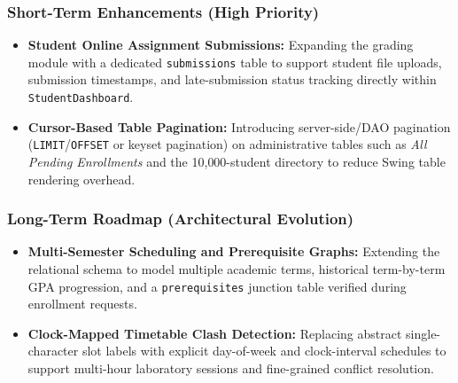\subsubsection{Short-Term Enhancements (High Priority)}
\begin{itemize}
    \item \textbf{Student Online Assignment Submissions:} Expanding the grading module with a dedicated \texttt{submissions} table to support student file uploads, submission timestamps, and late-submission status tracking directly within \texttt{StudentDashboard}.
    \item \textbf{Cursor-Based Table Pagination:} Introducing server-side/DAO pagination (\texttt{LIMIT}/\texttt{OFFSET} or keyset pagination) on administrative tables such as \emph{All Pending Enrollments} and the 10{,}000-student directory to reduce Swing table rendering overhead.
\end{itemize}

\subsubsection{Long-Term Roadmap (Architectural Evolution)}
\begin{itemize}
    \item \textbf{Multi-Semester Scheduling and Prerequisite Graphs:} Extending the relational schema to model multiple academic terms, historical term-by-term GPA progression, and a \texttt{prerequisites} junction table verified during enrollment requests.
    \item \textbf{Clock-Mapped Timetable Clash Detection:} Replacing abstract single-character slot labels with explicit day-of-week and clock-interval schedules to support multi-hour laboratory sessions and fine-grained conflict resolution.
\end{itemize}

